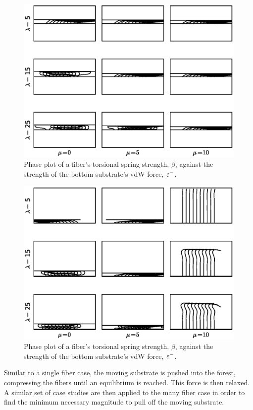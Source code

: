 	\begin{figure}
		\begin{center}
			\includegraphics[scale=1]{./fig/ch4/grid_g1000.eps}
		\end{center}		
		\caption{Phase plot of a fiber's torsional spring strength, $\beta$, against the strength of the bottom substrate's vdW force, $\varepsilon^-$.
		\label{fig:grid_g1000}}
	\end{figure}
	
	\begin{figure}
		\begin{center}
			\includegraphics[scale=1]{./fig/ch4/grid_et0.1.eps}
		\end{center}		
		\caption{Phase plot of a fiber's torsional spring strength, $\beta$, against the strength of the bottom substrate's vdW force, $\varepsilon^-$.
		\label{fig:grid_et0.1}}
	\end{figure}

Similar to a single fiber case, the moving substrate is pushed into the forest, compressing the fibers until an equilibrium is reached. This force is then relaxed. A similar set of case studies are then applied to the many fiber case in order to find the minimum necessary magnitude to pull off the moving substrate.